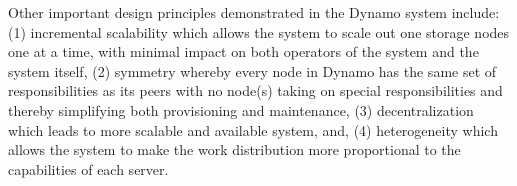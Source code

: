 \documentclass[11pt]{article}
\begin{document}
Other important design principles demonstrated in the Dynamo system 
include: (1) incremental scalability which allows the system to scale 
out one storage nodes one at a time, with minimal impact on both operators 
of the system and the system itself, (2) symmetry whereby every node in 
Dynamo has the same set of responsibilities as its peers with no node(s) 
taking on special responsibilities and thereby simplifying both 
provisioning and maintenance, (3) decentralization which leads to more 
scalable and available system, and, (4) heterogeneity which allows the 
system to make the work distribution more proportional to the capabilities 
of each server.












\nocite{*}

\end{document}
